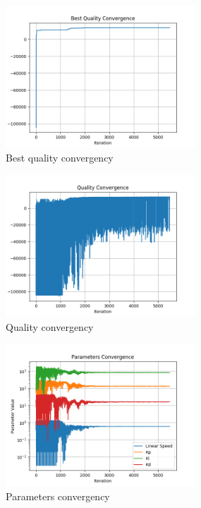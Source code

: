 

\begin{figure}
  \begin{center}
  \includegraphics[width=2.8in]{./../code/results/line_best_convergence.png}
  \caption{Best quality convergency}
  \label{img:best_quality_converge}
  \end{center}
\end{figure}

\begin{figure}
  \begin{center}
  \includegraphics[width=2.8in]{./../code/results/line_quality_convergence.png}
  \caption{Quality convergency}
  \label{img:quality_converge}
  \end{center}
\end{figure}

\begin{figure}
  \begin{center}
  \includegraphics[width=2.8in]{./../code/results/line_parameters_convergence.png}
  \caption{Parameters convergency}
  \label{img:parameters_quality_converge}
  \end{center}
\end{figure}

